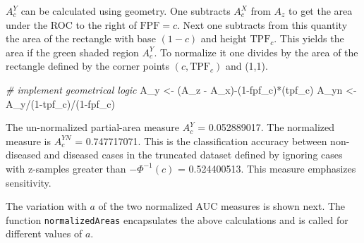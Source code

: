 \documentclass[
]{book}
\newenvironment{Shaded}{\begin{snugshade}}{\end{snugshade}}
\newcommand{\AttributeTok}[1]{\textcolor[rgb]{0.77,0.63,0.00}{#1}}
\newcommand{\CommentTok}[1]{\textcolor[rgb]{0.56,0.35,0.01}{\textit{#1}}}
\newcommand{\ControlFlowTok}[1]{\textcolor[rgb]{0.13,0.29,0.53}{\textbf{#1}}}
\newcommand{\DecValTok}[1]{\textcolor[rgb]{0.00,0.00,0.81}{#1}}
\newcommand{\FloatTok}[1]{\textcolor[rgb]{0.00,0.00,0.81}{#1}}
\newcommand{\FunctionTok}[1]{\textcolor[rgb]{0.00,0.00,0.00}{#1}}
\newcommand{\NormalTok}[1]{#1}
\newcommand{\OtherTok}[1]{\textcolor[rgb]{0.56,0.35,0.01}{#1}}
\newcommand{\SpecialCharTok}[1]{\textcolor[rgb]{0.00,0.00,0.00}{#1}}
\begin{document}
\(A_c^{Y}\) can be calculated using geometry. One subtracts \(A_c^{X}\) from \(A_z\) to get the area under the ROC to the right of \(\text{FPF}=c\). Next one subtracts from this quantity the area of the rectangle with base \((1 - c)\) and height \(\text{TPF}_c\). This yields the area if the green shaded region \(A_c^{Y}\). To normalize it one divides by the area of the rectangle defined by the corner points \((c,\text{TPF}_c)\) and (1,1).

\begin{Shaded}
\begin{Highlighting}[]
\CommentTok{\# implement geometrical logic}
\NormalTok{A\_y }\OtherTok{\textless{}{-}}\NormalTok{ (A\_z }\SpecialCharTok{{-}}\NormalTok{ A\_x)}\SpecialCharTok{{-}}\NormalTok{(}\DecValTok{1}\SpecialCharTok{{-}}\NormalTok{fpf\_c)}\SpecialCharTok{*}\NormalTok{(tpf\_c)}
\NormalTok{A\_yn }\OtherTok{\textless{}{-}}\NormalTok{ A\_y}\SpecialCharTok{/}\NormalTok{(}\DecValTok{1}\SpecialCharTok{{-}}\NormalTok{tpf\_c)}\SpecialCharTok{/}\NormalTok{(}\DecValTok{1}\SpecialCharTok{{-}}\NormalTok{fpf\_c) }
\end{Highlighting}
\end{Shaded}

The un-normalized partial-area measure \(A_c^{Y}\) = 0.052889017. The normalized measure is \(A_c^{YN}\) = 0.747717071. This is the classification accuracy between non-diseased and diseased cases in the truncated dataset defined by ignoring cases with z-samples greater than \(-\Phi^{-1}(c)\) = 0.524400513. This measure emphasizes sensitivity.

The variation with \(a\) of the two normalized AUC measures is shown next. The function \texttt{normalizedAreas} encapsulates the above calculations and is called for different values of \(a\).

\begin{Shaded}
\end{Shaded}
\end{document}
